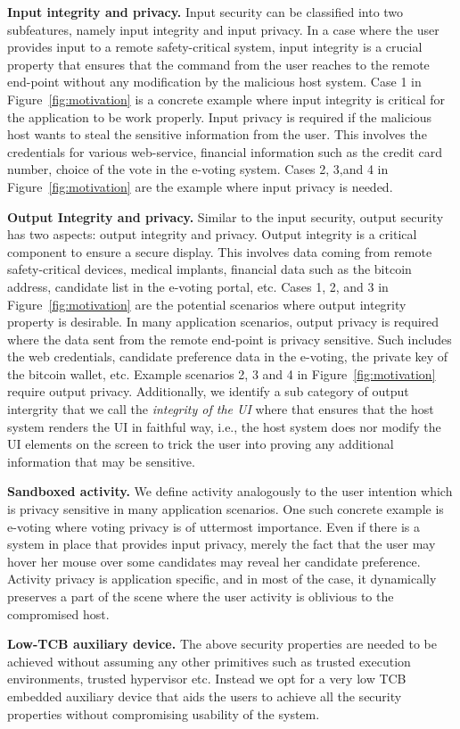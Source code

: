 \begin{mylist}
  \item \textbf{Input integrity and privacy.} Input security can be classified into two subfeatures, namely input integrity and input privacy. In a case where the user provides input to a remote safety-critical system, input integrity is a crucial property that ensures that the command from the user reaches to the remote end-point without any modification by the malicious host system. Case 1 in Figure~\ref{fig:motivation} is a concrete example where input integrity is critical for the application to be work properly. Input privacy is required if the malicious host wants to steal the sensitive information from the user. This involves the credentials for various web-service, financial information such as the credit card number, choice of the vote in the e-voting system. Cases 2, 3,and 4 in Figure~\ref{fig:motivation} are the example where input privacy is needed.
  \item \textbf{Output Integrity and privacy.} Similar to the input security, output security has two aspects: output integrity and privacy. Output integrity is a critical component to ensure a secure display. This involves data coming from remote safety-critical devices, medical implants, financial data such as the bitcoin address, candidate list in the e-voting portal, etc. Cases 1, 2, and 3 in Figure~\ref{fig:motivation} are the potential scenarios where output integrity property is desirable. In many application scenarios, output privacy is required where the data sent from the remote end-point is privacy sensitive. Such includes the web credentials, candidate preference data in the e-voting, the private key of the bitcoin wallet, etc. Example scenarios 2, 3 and 4 in Figure~\ref{fig:motivation} require output privacy. Additionally, we identify a sub category of output intergrity  that we call the \emph{integrity of the UI} where that ensures that the host system renders the UI in faithful way, i.e., the host system does nor modify the UI elements on the screen to trick the user into proving any additional information that may be sensitive.
  
  \item \textbf{Sandboxed activity.} We define activity analogously to the user intention which is privacy sensitive in many application scenarios. One such concrete example is e-voting where voting privacy is of uttermost importance. Even if there is a system in place that provides input privacy, merely the fact that the user may hover her mouse over some candidates may reveal her candidate preference. Activity privacy is application specific, and in most of the case, it dynamically preserves a part of the scene where the user activity is oblivious to the compromised host. 
  \item\textbf{Low-TCB auxiliary device.} The above security properties are needed to be achieved without assuming any other primitives such as trusted execution environments, trusted hypervisor etc. Instead we opt for a very low TCB embedded auxiliary device that aids the users to achieve all the security properties without compromising usability of the system. 
\end{mylist}



